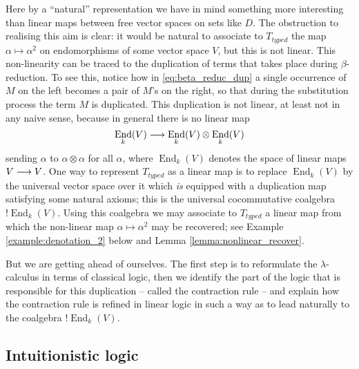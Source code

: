 \documentclass[english,letter paper,12pt,reqno]{article}
\theoremstyle{example}
\numberwithin{equation}{section}
\DeclareMathOperator{\End}{End}
\begin{document}
Here by a ``natural'' representation we have in mind something more interesting than linear maps between free vector spaces on sets like $D$. The obstruction to realising this aim is clear: it would be natural to associate to $T_{typed}$ the map $\alpha \mapsto \alpha^2$ on endomorphisms of some vector space $V$, but this is not linear. This non-linearity can be traced to the duplication of terms that takes place during $\beta$-reduction. To see this, notice how in \eqref{eq:beta_reduc_dup} a single occurrence of $M$ on the left becomes a pair of $M$'s on the right, so that during the substitution process the term $M$ is duplicated. This duplication is not linear, at least not in any naive sense, because in general there is no linear map
\begin{equation}\label{eq:dup_map_end}
\End_k(V) \lto \End_k(V) \otimes \End_k(V)
\end{equation}
sending $\alpha$ to $\alpha \otimes \alpha$ for all $\alpha$, where $\End_k(V)$ denotes the space of linear maps $V \longrightarrow V$. One way to represent $T_{typed}$ as a linear map is to replace $\End_k(V)$ by the universal vector space over it which \emph{is} equipped with a duplication map satisfying some natural axioms; this is the universal cocommutative coalgebra ${!} \End_k(V)$. Using this coalgebra we may associate to $T_{typed}$ a linear map from which the non-linear map $\alpha \mapsto \alpha^2$ may be recovered; see Example \ref{example:denotation_2} below and Lemma \ref{lemma:nonlinear_recover}. %

But we are getting ahead of ourselves. The first step is to reformulate the $\lambda$-calculus in terms of classical logic, then we identify the part of the logic that is responsible for this duplication -- called the contraction rule -- and explain how the contraction rule is refined in linear logic in such a way as to lead naturally to the coalgebra ${!} \End_k(V)$.

\subsection{Intuitionistic logic}
\end{document}
